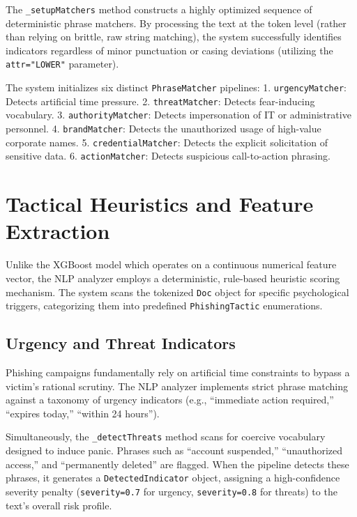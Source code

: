 The \texttt{\_setupMatchers} method constructs a highly optimized
sequence of deterministic phrase matchers. By processing the text at the
token level (rather than relying on brittle, raw string matching), the
system successfully identifies indicators regardless of minor
punctuation or casing deviations (utilizing the \texttt{attr="LOWER"}
parameter).

The system initializes six distinct \texttt{PhraseMatcher} pipelines: 1.
\texttt{urgencyMatcher}: Detects artificial time pressure. 2.
\texttt{threatMatcher}: Detects fear-inducing vocabulary. 3.
\texttt{authorityMatcher}: Detects impersonation of IT or administrative
personnel. 4. \texttt{brandMatcher}: Detects the unauthorized usage of
high-value corporate names. 5. \texttt{credentialMatcher}: Detects the
explicit solicitation of sensitive data. 6. \texttt{actionMatcher}:
Detects suspicious call-to-action phrasing.

\section{Tactical Heuristics and Feature
Extraction}\label{tactical-heuristics-and-feature-extraction}

Unlike the XGBoost model which operates on a continuous numerical
feature vector, the NLP analyzer employs a deterministic, rule-based
heuristic scoring mechanism. The system scans the tokenized \texttt{Doc}
object for specific psychological triggers, categorizing them into
predefined \texttt{PhishingTactic} enumerations.

\subsection{Urgency and Threat
Indicators}\label{urgency-and-threat-indicators}

Phishing campaigns fundamentally rely on artificial time constraints to
bypass a victim's rational scrutiny. The NLP analyzer implements strict
phrase matching against a taxonomy of urgency indicators (e.g.,
``immediate action required,'' ``expires today,'' ``within 24 hours'').

Simultaneously, the \texttt{\_detectThreats} method scans for coercive
vocabulary designed to induce panic. Phrases such as ``account
suspended,'' ``unauthorized access,'' and ``permanently deleted'' are
flagged. When the pipeline detects these phrases, it generates a
\texttt{DetectedIndicator} object, assigning a high-confidence severity
penalty (\texttt{severity=0.7} for urgency, \texttt{severity=0.8} for
threats) to the text's overall risk profile.

